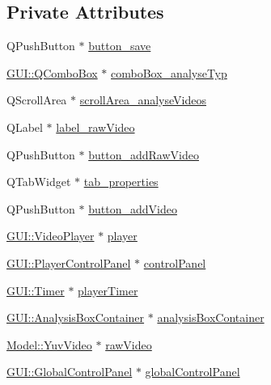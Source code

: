 \subsection*{Private Attributes}
\begin{DoxyCompactItemize}
\item 
Q\+Push\+Button $\ast$ \hyperlink{classGUI_1_1AnalysisTab_ac65ab223be901b07d3fb4ae0acf5f80f}{button\+\_\+save}
\item 
\hyperlink{classGUI_1_1QComboBox}{G\+U\+I\+::\+Q\+Combo\+Box} $\ast$ \hyperlink{classGUI_1_1AnalysisTab_a43dfb01359987ba27d34f6b0df4d730b}{combo\+Box\+\_\+analyse\+Typ}
\item 
Q\+Scroll\+Area $\ast$ \hyperlink{classGUI_1_1AnalysisTab_ac3a6aba72f0b920721f7b343fc52365d}{scroll\+Area\+\_\+analyse\+Videos}
\item 
Q\+Label $\ast$ \hyperlink{classGUI_1_1AnalysisTab_a0b0ef192a361769df582531bb748351f}{label\+\_\+raw\+Video}
\item 
Q\+Push\+Button $\ast$ \hyperlink{classGUI_1_1AnalysisTab_a90d6c396da735f1b44c56f86757da47e}{button\+\_\+add\+Raw\+Video}
\item 
Q\+Tab\+Widget $\ast$ \hyperlink{classGUI_1_1AnalysisTab_a4561738d42b83e7ac0bc4d9dd0672a2a}{tab\+\_\+properties}
\item 
Q\+Push\+Button $\ast$ \hyperlink{classGUI_1_1AnalysisTab_aea18698c81906e3048fb495952795dfc}{button\+\_\+add\+Video}
\item 
\hyperlink{classGUI_1_1VideoPlayer}{G\+U\+I\+::\+Video\+Player} $\ast$ \hyperlink{classGUI_1_1AnalysisTab_a649e16c560960a5b48ca2ec6bc1a7232}{player}
\item 
\hyperlink{classGUI_1_1PlayerControlPanel}{G\+U\+I\+::\+Player\+Control\+Panel} $\ast$ \hyperlink{classGUI_1_1AnalysisTab_a9cd8ff4f4ac3d1891c3b515ef1425d5a}{control\+Panel}
\item 
\hyperlink{classGUI_1_1Timer}{G\+U\+I\+::\+Timer} $\ast$ \hyperlink{classGUI_1_1AnalysisTab_ae542bcf9f3c84dd68282c029f3c09bb9}{player\+Timer}
\item 
\hyperlink{classGUI_1_1AnalysisBoxContainer}{G\+U\+I\+::\+Analysis\+Box\+Container} $\ast$ \hyperlink{classGUI_1_1AnalysisTab_a445fe0c2433d1fccb776a8968541b4ce}{analysis\+Box\+Container}
\item 
\hyperlink{classModel_1_1YuvVideo}{Model\+::\+Yuv\+Video} $\ast$ \hyperlink{classGUI_1_1AnalysisTab_a095285c6e168db68548acccc569736ed}{raw\+Video}
\item 
\hyperlink{classGUI_1_1GlobalControlPanel}{G\+U\+I\+::\+Global\+Control\+Panel} $\ast$ \hyperlink{classGUI_1_1AnalysisTab_a81bde05bdc9e3f7afd48a05d2fb4e2ec}{global\+Control\+Panel}
\end{DoxyCompactItemize}


